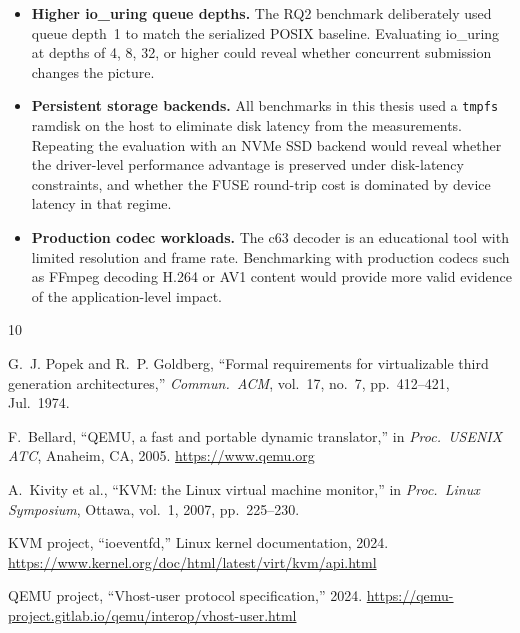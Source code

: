\documentclass[12pt, a4paper, oneside]{report}
\begin{document}
\begin{itemize}
  \item \textbf{Higher io\_uring queue depths.}  The RQ2 benchmark deliberately
    used queue depth~1 to match the serialized POSIX baseline.  Evaluating
    io\_uring at depths of 4, 8, 32, or higher could reveal whether concurrent submission changes the picture.

  \item \textbf{Persistent storage backends.}  All benchmarks in this thesis used
    a \texttt{tmpfs} ramdisk on the host to eliminate disk latency from the
    measurements.  Repeating the evaluation with an NVMe SSD backend would reveal
    whether the driver-level performance advantage is preserved under disk-latency
    constraints, and whether the FUSE round-trip cost is dominated by device
    latency in that regime.

  \item \textbf{Production codec workloads.}  The c63 decoder is an educational
    tool with limited resolution and frame rate.  Benchmarking with production
    codecs such as FFmpeg decoding H.264 or AV1 content would provide more
    valid evidence of the application-level impact.
\end{itemize}

\begin{thebibliography}{10}

G.~J. Popek and R.~P. Goldberg,
``Formal requirements for virtualizable third generation architectures,''
\textit{Commun.\ ACM}, vol.~17, no.~7, pp.~412--421, Jul.\ 1974.

F.~Bellard,
``QEMU, a fast and portable dynamic translator,''
in \textit{Proc.\ USENIX ATC}, Anaheim, CA, 2005.
\url{https://www.qemu.org}

A.~Kivity et al.,
``KVM: the Linux virtual machine monitor,''
in \textit{Proc.\ Linux Symposium}, Ottawa, vol.~1, 2007, pp.~225--230.

KVM project,
``ioeventfd,''
Linux kernel documentation, 2024.
\url{https://www.kernel.org/doc/html/latest/virt/kvm/api.html}

QEMU project,
``Vhost-user protocol specification,''
2024.
\url{https://qemu-project.gitlab.io/qemu/interop/vhost-user.html}

\end{thebibliography}
\end{document}
